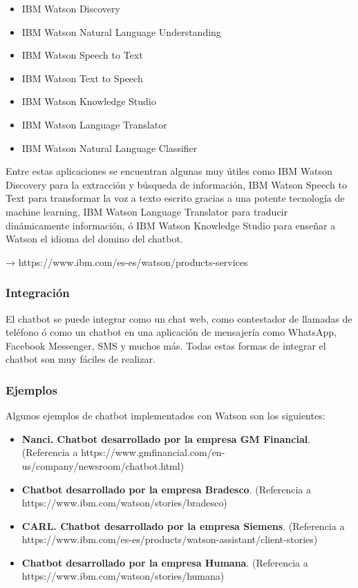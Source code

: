 \begin{itemize}
    \item IBM Watson Discovery
    \item IBM Watson Natural Language Understanding
    \item IBM Watson Speech to Text
    \item IBM Watson Text to Speech
    \item IBM Watson Knowledge Studio
    \item IBM Watson Language Translator
    \item IBM Watson Natural Language Classifier
\end{itemize}

Entre estas aplicaciones se encuentran algunas muy útiles como IBM Watson Discovery para la extracción y búsqueda de información, IBM Watson Speech to Text para transformar la voz a texto escrito gracias a una potente tecnología de machine learning, IBM Watson Language Translator para traducir dinámicamente información, ó IBM Watson Knowledge Studio para enseñar a Watson el idioma del domino del chatbot.



→ https://www.ibm.com/es-es/watson/products-services

\subsubsection*{Integración}

El chatbot se puede integrar como un chat web, como contestador de llamadas de teléfono ó como un chatbot en una aplicación de mensajería como WhatsApp, Facebook Messenger, SMS y muchos más. Todas estas formas de integrar el chatbot son muy fáciles de realizar.

\subsubsection*{Ejemplos}

Algunos ejemplos de chatbot implementados con Watson son los siguientes:

\begin{itemize}
    \item \textbf{Nanci. Chatbot desarrollado por la empresa GM Financial}. (Referencia a https://www.gmfinancial.com/en-us/company/newsroom/chatbot.html)
    \item \textbf{Chatbot desarrollado por la empresa Bradesco}. (Referencia a https://www.ibm.com/watson/stories/bradesco)
    \item \textbf{CARL. Chatbot desarrollado por la empresa Siemens}. (Referencia a https://www.ibm.com/es-es/products/watson-assistant/client-stories)
    \item \textbf{Chatbot desarrollado por la empresa Humana}. (Referencia a https://www.ibm.com/watson/stories/humana)
\end{itemize}




